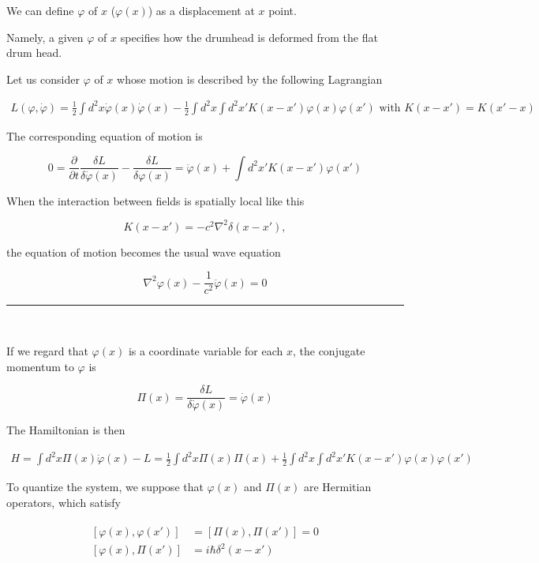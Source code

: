 We can define $\varphi$ of $x$ ($\varphi(x)$) as a displacement at $x$ point. 

Namely, a given $\varphi$ of $x$ specifies how the drumhead is deformed from the flat drum head. 

Let us consider $\varphi$ of $x$ whose motion is described by the following Lagrangian

\begin{align}
L(\varphi,\dot{\varphi}) = \frac{1}{2}\int d^2 x\dot{\varphi}(x)\dot{\varphi}(x) - \frac{1}{2}\int d^2 x \int d^2 x' K(x-x')\varphi(x)\varphi(x')\text{ with }K(x-x') = K(x'-x)
\end{align}

The corresponding equation of motion is

\begin{equation}
0 = \frac{\partial}{\partial t}\frac{\delta L}{\delta \dot{\varphi}(x)} - \frac{\delta L}{\delta \varphi(x)} = \ddot{\varphi}(x)+\int d^2 x' K(x-x')\varphi(x')
\end{equation}

When the interaction between fields is spatially local like this

\[K(x-x') = -c^2\nabla^2\delta(x-x'), \]

the equation of motion becomes the usual wave equation

\[\nabla^2\varphi(x) - \frac{1}{c^2}\ddot{\varphi}(x) = 0 \]

\hrule

\ 

If we regard that $\varphi(x)$ is a coordinate variable for each $x$, the conjugate momentum to $\varphi$ is

\[\Pi(x) = \frac{\delta L}{\delta \dot{\varphi}(x)} = \dot{\varphi}(x) \]

The Hamiltonian is then 

\begin{align}
H = \int d^2 x \Pi(x) \dot{\varphi}(x) - L = \frac{1}{2}\int d^2 x \Pi(x)\Pi(x)+\frac{1}{2}\int d^2 x \int d^2 x' K(x-x') \varphi(x)\varphi(x')
\end{align}

To quantize the system, we suppose that $\varphi(x)$ and $\Pi(x)$ are Hermitian operators, which satisfy

\begin{align}
\begin{split}
[\varphi(x),\varphi(x')] &= [\Pi(x),\Pi(x')] = 0\\
[\varphi(x),\Pi(x')] &= i\hbar\delta^2(x-x')
\end{split}
\end{align}

